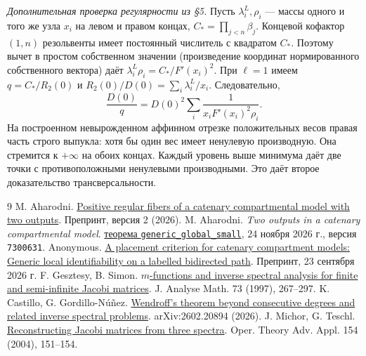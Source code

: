 \documentclass[11pt,a4paper]{article}
\begin{document}
\smallskip\noindent\textit{Дополнительная проверка регулярности из §5.}
Пусть \(\lambda_i^L,\rho_i\) --- массы одного и того же узла \(x_i\) на левом и правом концах, \(C_*=\prod_{j<n}\beta_j\). Концевой кофактор \((1,n)\) резольвенты имеет постоянный числитель с квадратом \(C_*\). Поэтому вычет в простом собственном значении (произведение координат нормированного собственного вектора) даёт
\(\lambda_i^L\rho_i=C_*/F'(x_i)^2\). При \(\ell=1\) имеем \(q=C_*/R_2(0)\) и \(R_2(0)/D(0)=\sum_i\lambda_i^L/x_i\). Следовательно,
\[
        \frac{D(0)}q
          = D(0)^2\sum_i\frac{1}{x_i F'(x_i)^2\rho_i}.
\]
На построенном невырожденном аффинном отрезке положительных весов правая часть строго выпукла: хотя бы один вес имеет ненулевую производную. Она стремится к \(+\infty\) на обоих концах. Каждый уровень выше минимума даёт две точки с противоположными ненулевыми производными. Это даёт второе доказательство трансверсальности.

\begin{thebibliography}{9}\small
{} M. Aharodni. \href{https://github.com/qqhgdkktu/catenary-identifiability/releases/tag/global-multiplicity-v2}{Positive regular fibers of a catenary compartmental model with two outputs}. Препринт, версия 2 (2026).
 M. Aharodni. \textit{Two outputs in a catenary compartmental model}. \href{https://github.com/qqhgdkktu/catenary-identifiability/blob/7300631e25bea9a7afe03e6426122d93010a423d/Chain/EndpointExterior.lean\#L329-L341}{теорема \texttt{generic\_global\_small}}, 24 ноября 2026 г., версия \texttt{7300631}.
 Anonymous. \href{https://doi.org/10.5281/zenodo.22909460}{A placement criterion for catenary compartment models: Generic local identifiability on a labelled bidirected path}. Препринт, 23 сентября 2026 г.
 F. Gesztesy, B. Simon. \href{https://doi.org/10.1007/BF02788147}{\(m\)-functions and inverse spectral analysis for finite and semi-infinite Jacobi matrices}. J. Analyse Math. 73 (1997), 267--297.
 K. Castillo, G. Gordillo-Núñez. \href{https://arxiv.org/abs/2602.20894}{Wendroff's theorem beyond consecutive degrees and related inverse spectral problems}. arXiv:2602.20894 (2026).
 J. Michor, G. Teschl. \href{https://arxiv.org/abs/math/0211051}{Reconstructing Jacobi matrices from three spectra}. Oper. Theory Adv. Appl. 154 (2004), 151--154.
\end{thebibliography}
\end{document}
